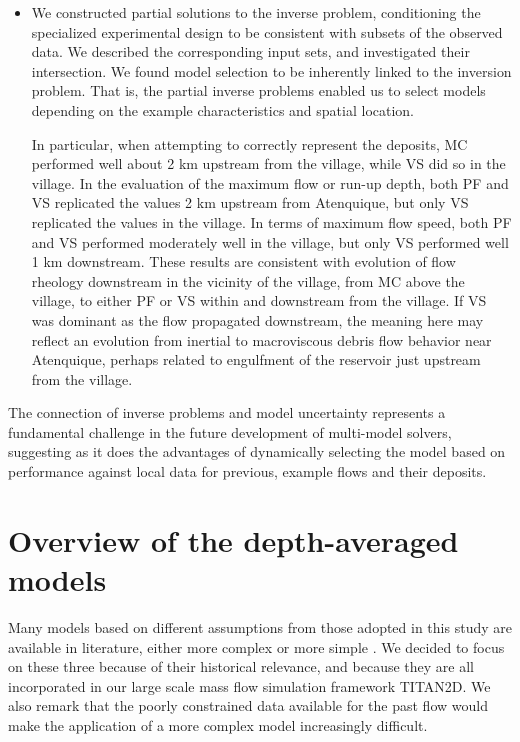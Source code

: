 \documentclass[nhess, manuscript]{copernicus}
\begin{document}
\begin{itemize}
  \item We constructed partial solutions to the inverse problem, conditioning the specialized experimental design to be consistent with subsets of the observed data. We  described the corresponding input sets, and investigated their intersection. We found model selection to be inherently linked to the inversion problem. That is, the partial inverse problems enabled us to select models depending on the example characteristics and spatial location.

      In particular, when attempting to correctly represent the deposits, MC performed well about 2 km upstream from the village, while VS did so in the village. In the evaluation of the maximum flow or run-up depth, both PF and VS replicated the values 2 km upstream from Atenquique, but only VS replicated the values in the village. In terms of maximum flow speed, both PF and VS performed moderately well in the village, but only VS performed well 1 km downstream.  These results are consistent with evolution of flow rheology downstream in the vicinity of the village, from MC above the village, to either PF or VS within and downstream from the village.  If VS was dominant as the flow propagated downstream, the meaning here may reflect an evolution from inertial to macroviscous debris flow behavior near Atenquique, perhaps related to engulfment of the reservoir just upstream from the village.
\end{itemize}
The connection of inverse problems and model uncertainty represents a fundamental challenge in the future development of multi-model solvers, suggesting as it does the advantages of dynamically selecting the model based on performance against local data for previous, example flows and their deposits.


\appendix
\section{Overview of the depth-averaged models}\label{A-1}
Many models based on different assumptions from those adopted in this study are available in literature, either more complex \citep{PitmanLe2005,Iverson2014} or more simple \citep{DadeHuppert1998,Kelfoun2009}. We decided to focus on these three because of their historical relevance, and because they are all incorporated in our large scale mass flow simulation framework TITAN2D. We also remark that the poorly constrained data available for the past flow would make the application of a more complex model increasingly difficult.
\end{document}
